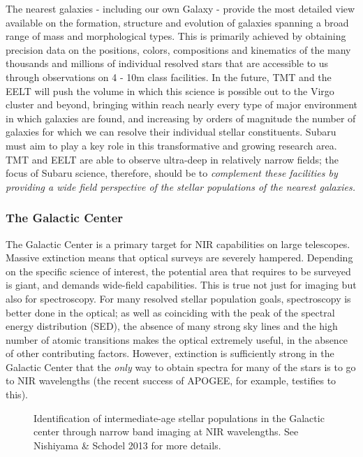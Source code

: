 The nearest galaxies - including our own Galaxy - provide the most
detailed view available on the formation, structure and evolution of
galaxies spanning a broad range of mass and morphological types. This is
primarily achieved by obtaining precision data on the positions, colors,
compositions and kinematics of the many thousands and millions of
individual resolved stars that are accessible to us through observations
on 4 - 10m class facilities. In the future, TMT and the EELT will push
the volume in which this science is possible out to the Virgo cluster
and beyond, bringing within reach nearly every type of major environment
in which galaxies are found, and increasing by orders of magnitude the
number of galaxies for which we can resolve their individual stellar
constituents. Subaru must aim to play a key role in this transformative
and growing research area. TMT and EELT are able to observe ultra-deep
in relatively narrow fields; the focus of Subaru science, therefore,
should be to {\it complement these facilities by providing a wide field
perspective of the stellar populations of the nearest galaxies.} 

\subsubsection{The Galactic Center}

The Galactic Center is a primary target for NIR capabilities on large
telescopes. Massive extinction means that optical surveys are severely
hampered. Depending on the specific science of interest, the potential
area that requires to be surveyed is giant, and demands wide-field
capabilities. This is true not just for imaging but also for
spectroscopy. For many resolved stellar population goals, spectroscopy
is better done in the optical; as well as coinciding with the peak of
the spectral energy distribution (SED), the absence of many strong sky
lines and the high number of atomic transitions  makes the optical
extremely useful, in the absence of other contributing factors. However,
extinction is sufficiently strong in the Galactic Center that the {\it
only} way to obtain spectra for many of the stars is to go to NIR
wavelengths (the recent success of APOGEE, for example, testifies to
this). 

\begin{figure*}[htb]
  \begin{center}
    \caption{Identification of intermediate-age stellar populations in
   the Galactic center through narrow band imaging at NIR
   wavelengths. See Nishiyama \& Schodel 2013 for more details.}
  \end{center}
\end{figure*}

